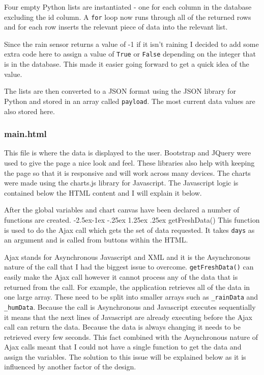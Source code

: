 \documentclass[10pt,a4paper]{article}
\makeatletter
\renewcommand\paragraph{\@startsection{paragraph}{4}{\z@}%
            {-2.5ex\@plus -1ex \@minus -.25ex}%
            {1.25ex \@plus .25ex}%
            {\normalfont\normalsize\bfseries}}
\makeatother
\begin{document}
Four empty Python lists are instantiated - one for each column in the database excluding the id column. A \texttt{for} loop now runs through all of the returned rows and for each row inserts the relevant piece of data into the relevant list. 

Since the rain sensor returns a value of -1 if it isn't raining I decided to add some extra code here to assign a value of \texttt{True} or \texttt{False} depending on the integer that is in the database. This made it easier going forward to get a quick idea of the value. 

The lists are then converted to a JSON format using the JSON library for Python and stored in an array called \texttt{payload}. The most current data values are also stored here. 

\subsubsection{main.html}
This file is where the data is displayed to the user. Bootstrap and JQuery were used to give the page a nice look and feel. These libraries also help with keeping the page so that it is responsive and will work across many devices. The charts were made using the charts.js library for Javascript. The Javascript logic is contained below the HTML content and I will explain it below. 

After the global variables and chart canvas have been declared a number of functions are created. 
\paragraph{getFreshData()}
This function is used to do the Ajax call which gets the set of data requested. It takes \texttt{days} as an argument and is called from buttons within the HTML. 

Ajax stands for Asynchronous Javascript and XML and it is the Asynchronous nature of the call that I had the biggest issue to overcome. \texttt{getFreshData()} can easily make the Ajax call however it cannot process any of the data that is returned from the call. For example, the application retrieves all of the data in one large array. These need to be split into smaller arrays such as \texttt{\_rainData} and \texttt{\_humData}. Because the call is Asynchronous and Javascript executes sequentially it means that the next lines of Javascript are already executing before the Ajax call can return the data. Because the data is always changing it needs to be retrieved every few seconds. This fact combined with the Asynchronous nature of Ajax calls meant that I could not have a single function to get the data and assign the variables. The solution to this issue will be explained below as it is influenced by another factor of the design. 
\end{document}
